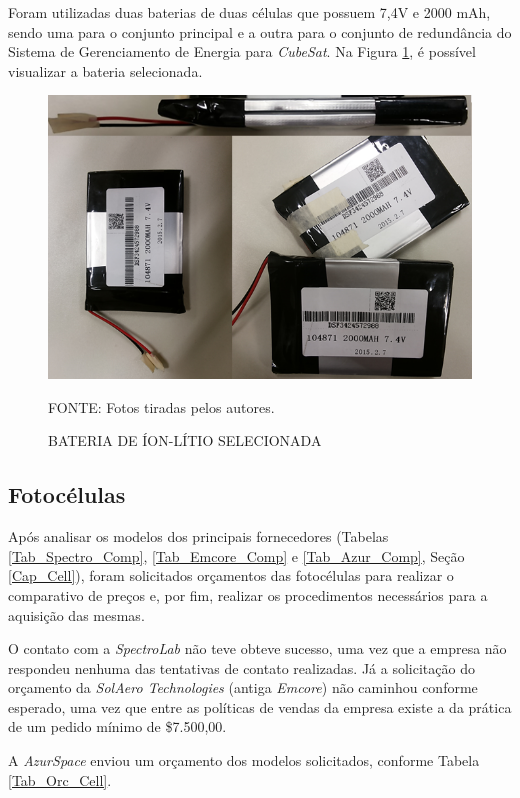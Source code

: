 \documentclass[
	12pt,				%
	openright,			%
	oneside,			%
	a4paper,			%
	english,			%
	french,				%
	spanish,			%
	brazil,				%
	oldfontcommands
	]{abntex2}
\begin{document}
	Foram utilizadas duas baterias de duas células que possuem 7,4V e 2000 mAh, sendo uma para o conjunto principal e a outra para o conjunto de redundância do Sistema de Gerenciamento de Energia para \textit{CubeSat}. Na Figura \ref{Fig_Bat_Sel}, é possível visualizar a bateria selecionada.
	
	\begin{figure}[th]
		\caption{BATERIA DE ÍON-LÍTIO SELECIONADA}
		\label{Fig_Bat_Sel}
		\centering
		\includegraphics[width=0.8\linewidth]{./figs/cubesat_04}
			
		\begin{small}
			FONTE: Fotos tiradas pelos autores.
		\end{small}
	\end{figure}
	\pagebreak
		
\subsection[Fotocélulas]{Fotocélulas}

	Após analisar os modelos dos principais fornecedores (Tabelas \ref{Tab_Spectro_Comp}, \ref{Tab_Emcore_Comp} e \ref{Tab_Azur_Comp}, Seção \ref{Cap_Cell}), foram solicitados orçamentos das fotocélulas para realizar o comparativo de preços e, por fim, realizar os procedimentos necessários para a aquisição das mesmas.
	
	O contato com a \textit{SpectroLab} não teve obteve sucesso, uma vez que a empresa não respondeu nenhuma das tentativas de contato realizadas. Já a solicitação do orçamento da \textit{SolAero Technologies} (antiga \textit{Emcore}) não caminhou conforme esperado, uma vez que entre as políticas de vendas da empresa existe a da prática de um pedido mínimo de \$7.500,00.
	
	A \textit{AzurSpace} enviou um orçamento dos modelos solicitados, conforme Tabela \ref{Tab_Orc_Cell}.
	
\end{document}
